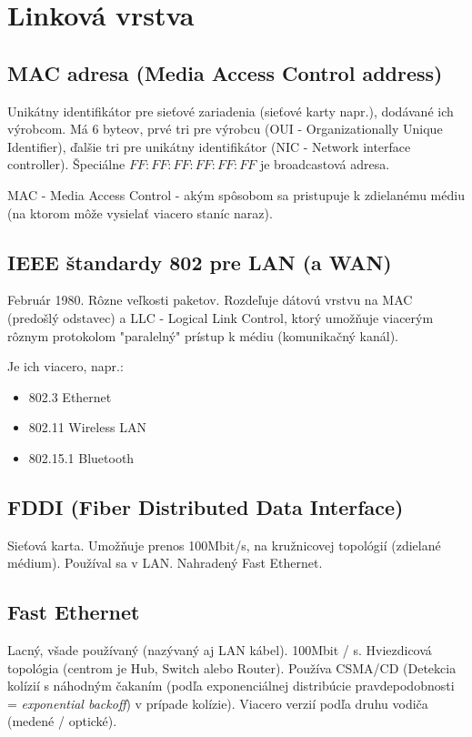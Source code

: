 \documentclass[10pt,a4paper]{article}
\begin{document}
 
\section{Linková vrstva}        
\subsection{MAC adresa (Media Access Control address)}     
Unikátny identifikátor pre sieťové zariadenia (sieťové karty napr.),
dodávané ich výrobcom. Má 6 byteov, prvé tri pre výrobcu (OUI - Organizationally Unique Identifier), ďalšie tri pre unikátny identifikátor (NIC - Network interface controller). Špeciálne $FF:FF:FF:FF:FF:FF$ je broadcastová adresa. 
          
MAC -  Media Access Control - akým spôsobom sa pristupuje k zdielanému médiu (na ktorom môže vysielať viacero staníc naraz).          
\subsection{IEEE štandardy 802 pre LAN (a WAN)}  
Február 1980. Rôzne veľkosti paketov. Rozdeľuje dátovú vrstvu na MAC  (predošlý odstavec) a LLC - Logical Link Control, ktorý umožňuje viacerým rôznym protokolom "paralelný" prístup k médiu (komunikačný kanál).

Je ich viacero, napr.:
\begin{itemize}
\item 802.3 Ethernet      
\item 802.11 Wireless LAN
\item 802.15.1 Bluetooth 
\end{itemize}

\subsection{FDDI (Fiber Distributed Data Interface)}  
Sieťová karta. Umožňuje prenos 100Mbit/s, na kružnicovej topológií (zdielané médium). Používal sa v LAN. Nahradený Fast Ethernet.    
                 
\subsection{Fast Ethernet}            
Lacný, všade používaný (nazývaný aj LAN kábel).
100Mbit / s. Hviezdicová topológia (centrom je Hub, Switch alebo Router).
Používa CSMA/CD (Detekcia kolízií s náhodným čakaním (podľa exponenciálnej distribúcie pravdepodobnosti = \emph{exponential backoff}) v prípade kolízie). Viacero verzií podľa druhu vodiča (medené / optické).
\end{document}
